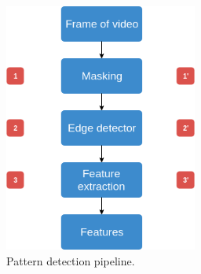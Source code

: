 \documentclass[journal]{IEEEtran}
\begin{document}
\begin{figure}[H]
\centering
\includegraphics[width=2.5in]{../_img/algorithm_overview.png}
\caption{Pattern detection pipeline.}
\end{figure}
\end{document}
